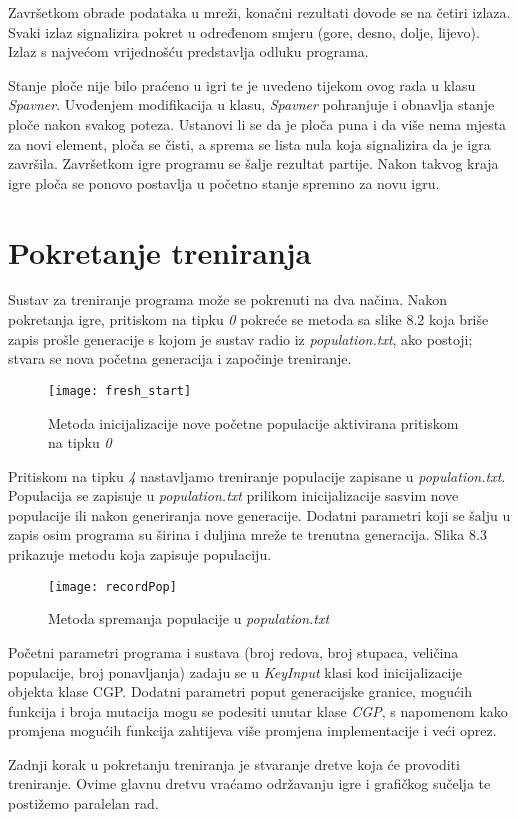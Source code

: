 \par
Završetkom obrade podataka u mreži, konačni rezultati dovode se na četiri izlaza. Svaki izlaz signalizira pokret u određenom smjeru (gore, desno, dolje, lijevo). Izlaz s najvećom vrijednošću predstavlja odluku programa.
\par
Stanje ploče nije bilo praćeno u igri te je uvedeno tijekom ovog rada u klasu \textit{Spavner}. Uvođenjem modifikacija u klasu, \textit{Spavner} pohranjuje i obnavlja stanje ploče nakon svakog poteza. Ustanovi li se da je ploča puna i da više nema mjesta za novi element, ploča se čisti, a sprema se lista nula koja signalizira da je igra završila. Završetkom igre programu se šalje rezultat partije. Nakon takvog kraja igre ploča se ponovo postavlja u početno stanje spremno za novu igru.
\
\par 
\section{Pokretanje treniranja}
\quad Sustav za treniranje programa može se pokrenuti na dva načina. Nakon pokretanja igre, pritiskom na tipku \textit{0} pokreće se metoda sa slike 8.2 koja briše zapis prošle generacije s kojom je sustav radio iz \textit{population.txt}, ako postoji; stvara se nova početna generacija i započinje treniranje.
\begin{figure}[h]
	\centering
	\texttt{[image: fresh\_start]}
	\caption{Metoda inicijalizacije nove početne populacije aktivirana pritiskom na tipku \textit{0}}
\end{figure}
\par Pritiskom na tipku \textit{4} nastavljamo treniranje populacije zapisane u \textit{population.txt}. Populacija se zapisuje u \textit{population.txt} prilikom inicijalizacije sasvim nove populacije ili nakon generiranja nove generacije. Dodatni parametri koji se šalju u zapis osim programa su širina i duljina mreže te trenutna generacija. Slika 8.3 prikazuje metodu koja zapisuje populaciju.
\begin{figure}[h]
	\centering
	\texttt{[image: recordPop]}
	\caption{Metoda spremanja populacije u \textit{population.txt}}
\end{figure}\newline
\par
 Početni parametri programa i sustava (broj redova, broj stupaca, veličina populacije, broj ponavljanja) zadaju se u \textit{KeyInput} klasi kod inicijalizacije objekta klase CGP. Dodatni parametri poput generacijske granice, mogućih funkcija i broja mutacija mogu se podesiti unutar klase \textit{CGP}, s napomenom kako promjena mogućih funkcija zahtijeva više promjena implementacije i veći oprez.
\par
Zadnji korak u pokretanju treniranja je stvaranje dretve koja će provoditi treniranje. Ovime glavnu dretvu vraćamo održavanju igre i grafičkog sučelja te postižemo paralelan rad.
